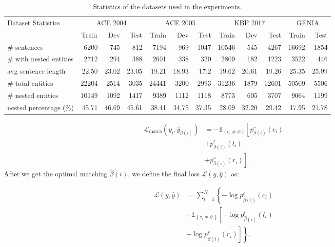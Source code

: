 \documentclass{article}
\begin{document}
\begin{table*}
\centering
\begin{tabular}{lrrrrrrrrrrr}
\toprule
\multirow{2}{*}{Dataset Statistics}   & \multicolumn{3}{c}{ACE 2004}& \multicolumn{3}{c}{ACE 2005} & \multicolumn{3}{c}{KBP 2017} & \multicolumn{2}{c}{GENIA}  \\
 \cmidrule(lr){2-4}  \cmidrule(lr){5-7} \cmidrule(lr){8-10} \cmidrule(lr){11-12}  
& Train  & Dev & Test & Train  & Dev & Test & Train  & Dev & Test & Train   & Test  \\
\midrule
\# sentences &  6200 &  745 &  812 &  7194 &  969 &  1047 &  10546 &  545 & 4267 &  16692 &   1854 \\
\# with nested entities  &  2712 &  294 &  388 &  2691 &  338 &  320 &  2809 &  182 &  1223 &  3522 &   446 \\
avg sentence length &  22.50 &  23.02 &  23.05 &  19.21 &  18.93 &  17.2 &  19.62 &  20.61 &  19.26 &  25.35 &    25.99 \\
\# total entities &  22204 &  2514 &  3035 &  24441 &  3200 &  2993 &  31236 &  1879 &  12601 &  50509 &    5506 \\
\# nested entities &  10149 &  1092 & 1417  & 9389 &  1112 &  1118 &  8773 &  605 &  3707 &  9064 &    1199 \\
 nested percentage (\%) &  45.71 & 46.69 &  45.61 & 38.41 & 34.75 &  37.35 &  28.09 & 32.20 &  29.42 &  17.95 &    21.78 \\
\bottomrule

\end{tabular}
\caption{Statistics of the datasets used in the experiments.}
\label{tab:statistics}
\end{table*}

\begin{equation}
\begin{aligned}
\mathcal{L}_{\operatorname{match}}\left(y_{i}, \hat{y}_{\beta(i)}\right) &=-\mathds{1}_{\left\{c_{i} \neq \varnothing\right\}}\left[{p}_{\beta(i)}^{c}\left(c_{i}\right)\right.\\
&+{p}_{\beta(i)}^{l}\left(l_{i}\right) \\
&\left.+{p}_{\beta(i)}^{r}\left(r_{i}\right)\right].
\end{aligned}
\end{equation}
After we get the optimal matching $\hat{\beta}(i)$, we define the final loss $\mathcal{L}(y, \hat{y})$ as:

\begin{equation}
\begin{aligned}
\mathcal{L}(y, \hat{y})&=\sum_{i=1}^{N}\left\{-\log {p}_{\hat{\beta}(i)}^{c}\left(c_{i}\right)\right.\\
&+\mathds{1}_{\left\{c_{i} \neq \varnothing\right\}}\left[-\log {p}_{\hat{\beta}(i)}^{l}\left(l_{i}\right)\right.\\
&\left.\left.-\log {p}_{\hat{\beta}(i)}^{r}\left(r_{i}\right)\right]\right\}.
\end{aligned}
\end{equation}
\end{document}
